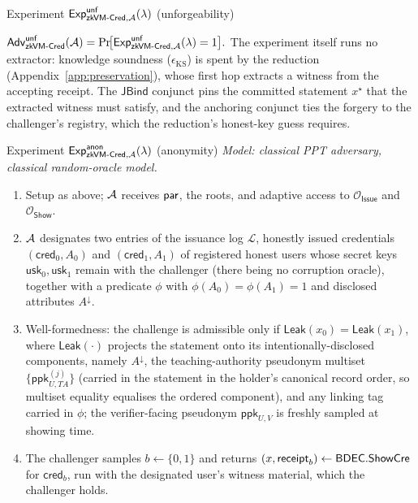 \begin{gamebox}{Experiment $\mathsf{Exp}^{\mathsf{unf}}_{\mathsf{zkVM\text{-}Cred},\mathcal{A}}(\lambda)$ (unforgeability)}
\begin{enumerate}
    \end{enumerate}
    $\displaystyle
    \mathsf{Adv}^{\mathsf{unf}}_{\mathsf{zkVM\text{-}Cred}}(\mathcal{A})=\Pr\!\bigl[\mathsf{Exp}^{\mathsf{unf}}_{\mathsf{zkVM\text{-}Cred},\mathcal{A}}(\lambda)=1\bigr].$ The experiment itself runs no extractor: knowledge soundness ($\epsilon_{\mathrm{KS}}$) is spent by the reduction (Appendix~\ref{app:preservation}), whose first hop extracts a witness from the accepting receipt. The $\mathsf{JBind}$ conjunct pins the committed statement $x^\star$ that the extracted witness must satisfy, and the anchoring conjunct ties the forgery to the challenger's registry, which the reduction's honest-key guess requires.
\end{gamebox}

\begin{gamebox}{Experiment $\mathsf{Exp}^{\mathsf{anon}}_{\mathsf{zkVM\text{-}Cred},\mathcal{A}}(\lambda)$ (anonymity)}
    \emph{Model: classical PPT adversary, classical random-oracle model.}\par\smallskip
    \begin{enumerate}
        \item Setup as above; $\mathcal{A}$ receives $\mathsf{par}$, the roots, and adaptive access to $\mathcal O_{\mathsf{Issue}}$ and $\mathcal O_{\mathsf{Show}}$.
        \item $\mathcal{A}$ designates two entries of the issuance log $\mathcal L$, honestly issued credentials $(\mathsf{cred}_0,A_0)$ and $(\mathsf{cred}_1,A_1)$ of registered honest users whose secret keys $\mathsf{usk}_0,\mathsf{usk}_1$ remain with the challenger (there being no corruption oracle), together with a predicate $\phi$ with $\phi(A_0)=\phi(A_1)=1$ and disclosed attributes $A^\downarrow$.
        \item Well-formedness: the challenge is admissible only if $\mathsf{Leak}(x_0)=\mathsf{Leak}(x_1)$, where $\mathsf{Leak}(\cdot)$ projects the statement onto its intentionally-disclosed components, namely $A^\downarrow$, the teaching-authority pseudonym multiset $\{\mathsf{ppk}_{U,TA}^{(j)}\}$ (carried in the statement in the holder's canonical record order, so multiset equality equalises the ordered component), and any linking tag carried in $\phi$; the verifier-facing pseudonym $\mathsf{ppk}_{U,V}$ is freshly sampled at showing time.
        \item The challenger samples $b\leftarrow\{0,1\}$ and returns $(x,\mathsf{receipt}_b)\leftarrow\mathsf{BDEC}.\mathsf{ShowCre}$ for $\mathsf{cred}_b$, run with the designated user's witness material, which the challenger holds.

\end{enumerate}
\end{gamebox}
